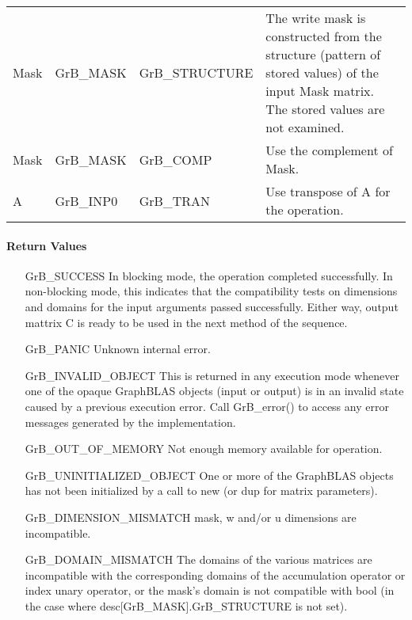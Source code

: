 \begin{itemize}[leftmargin=1.1in]
\begin{tabular}{lllp{2.7in}}
        {\sf Mask} & {\sf GrB\_MASK} & {\sf GrB\_STRUCTURE}   & The write mask is
        constructed from the structure (pattern of stored values) of the input
        {\sf Mask} matrix. The stored values are not examined.\\

        {\sf Mask} & {\sf GrB\_MASK} & {\sf GrB\_COMP}   & Use the 
        complement of {\sf Mask}. \\

        {\sf A}    & {\sf GrB\_INP0} & {\sf GrB\_TRAN}   & Use transpose of {\sf A}
        for the operation. \\
    \end{tabular}
\end{itemize}


\paragraph{Return Values}

\begin{itemize}[leftmargin=2.1in]
    \item[{\sf GrB\_SUCCESS}]         In blocking mode, the operation completed
    successfully. In non-blocking mode, this indicates that the compatibility 
    tests on dimensions and domains for the input arguments passed successfully. 
    Either way, output mattrix {\sf C} is ready to be used in the next method of 
    the sequence.

    \item[{\sf GrB\_PANIC}]           Unknown internal error.

    \item[{\sf GrB\_INVALID\_OBJECT}] This is returned in any execution mode 
    whenever one of the opaque GraphBLAS objects (input or output) is in an invalid 
    state caused by a previous execution error.  Call {\sf GrB\_error()} to access 
    any error messages generated by the implementation.

    \item[{\sf GrB\_OUT\_OF\_MEMORY}] Not enough memory available for operation.

    \item[{\sf GrB\_UNINITIALIZED\_OBJECT}] One or more of the GraphBLAS objects
    has not been initialized by a call to {\sf new} (or {\sf dup} for matrix
    parameters).

    \item[{\sf GrB\_DIMENSION\_MISMATCH}]  {\sf mask}, {\sf w} and/or {\sf u}
    dimensions are incompatible.

    \item[{\sf GrB\_DOMAIN\_MISMATCH}]    The domains of the various matrices are
    incompatible with the corresponding domains of the accumulation operator
    or index unary operator, or the mask's domain is not compatible with {\sf bool}
    (in the case where {\sf desc[GrB\_MASK].GrB\_STRUCTURE} is not set).
\end{itemize}

